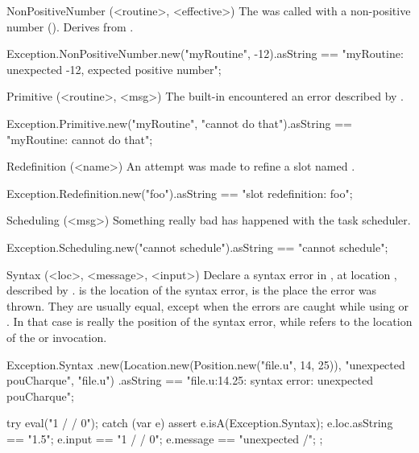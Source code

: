 \begin{urbiscriptapi}
\item[NonPositiveNumber](<routine>, <effective>)
  The  was called with a non-positive number
  ().  Derives from .
\begin{urbiassert}
Exception.NonPositiveNumber.new("myRoutine", -12).asString
== "myRoutine: unexpected -12, expected positive number";
\end{urbiassert}

\item[Primitive](<routine>, <msg>)
  The built-in  encountered an error described by
  .
\begin{urbiassert}
Exception.Primitive.new("myRoutine", "cannot do that").asString
  == "myRoutine: cannot do that";
\end{urbiassert}

\item[Redefinition](<name>)
  An attempt was made to refine a slot named .
\begin{urbiassert}
Exception.Redefinition.new("foo").asString
  == "slot redefinition: foo";
\end{urbiassert}

\item[Scheduling](<msg>)
  Something really bad has happened with the \urbi task scheduler.
\begin{urbiassert}
Exception.Scheduling.new("cannot schedule").asString
  == "cannot schedule";
\end{urbiassert}

\item[Syntax](<loc>, <message>, <input>)
  Declare a syntax error in , at location ,
  described by .   is the location of the syntax
  error,  is the place the error was thrown.  They are
  usually equal, except when the errors are caught while using
   or .  In that case
   is really the position of the syntax error, while
   refers to the location of the 
  or  invocation.
\begin{urbiassert}
Exception.Syntax
  .new(Location.new(Position.new("file.u", 14, 25)),
       "unexpected pouCharque", "file.u")
  .asString
== "file.u:14.25: syntax error: unexpected pouCharque";
\end{urbiassert}

\begin{urbiscript}
try
{
  eval("1 / / 0");
}
catch (var e)
{
  assert
  {
    e.isA(Exception.Syntax);
    e.loc.asString == "1.5";
    e.input == "1 / / 0";
    e.message == "unexpected /";
  }
};
\end{urbiscript}


\end{urbiscriptapi}
